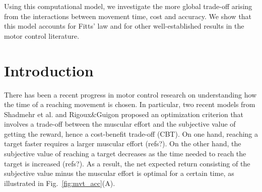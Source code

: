 \documentclass[10pt]{article}
\begin{document}
Using this computational model, we investigate the more global trade-off arising from the interactions between movement time, cost and accuracy. We show that this model accounts for Fitts' law and for other well-established results in the motor control literature.

\section{Introduction}

There has been a recent progress in motor control research on understanding how the time of a reaching movement is chosen. In particular, two recent models from Shadmehr et al. \cite{shadmehr10} and Rigoux\&Guigon \cite{rigoux12} proposed an optimization criterion that involves a trade-off between the muscular effort and the subjective value of getting the reward, hence a cost-benefit trade-off (CBT).
On one hand, reaching a target faster requires a larger muscular effort (refs?). On the other hand, the subjective value of reaching a target decreases as the time needed to reach the target is increased (refs?). As a result, the net expected return consisting of the subjective value minus the muscular effort is optimal for a certain time, as illustrated in Fig.~\ref{fig:mvt_acc}(A).
\end{document}
